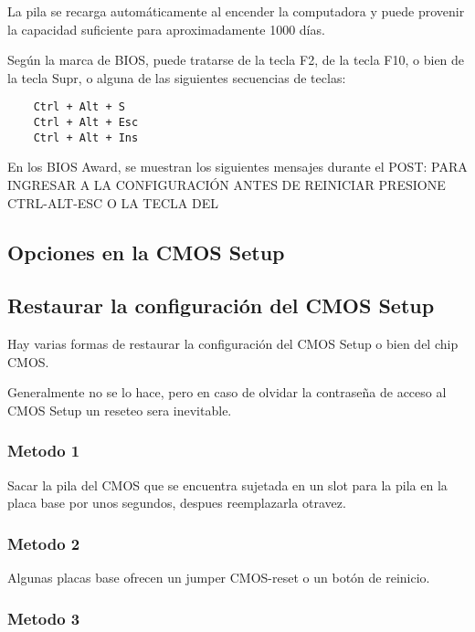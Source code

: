 \documentclass[12pt,oneside,a4paper]{article}
\begin{document}
	La pila se recarga automáticamente al encender la computadora y puede
	provenir la capacidad suficiente para aproximadamente 1000 días.

	Según la marca de BIOS, puede tratarse de la tecla F2, de la tecla F10, o
	bien de la tecla Supr, o alguna de las siguientes secuencias de teclas: 

	\begin{verbatim}
	Ctrl + Alt + S 
	Ctrl + Alt + Esc 
	Ctrl + Alt + Ins 
	\end{verbatim}

	En los BIOS Award, se muestran los siguientes mensajes durante el POST:
	PARA INGRESAR A LA CONFIGURACIÓN ANTES DE REINICIAR PRESIONE CTRL-ALT-ESC O LA TECLA DEL
	\subsection{Opciones en la CMOS Setup}

	\subsection{Restaurar la configuración del CMOS Setup}{\label{sec:cmossetup/resetear-el-cmos-setup}}

	Hay varias formas de restaurar la configuración del CMOS Setup o bien del chip CMOS.

	Generalmente no se lo hace, pero en caso de olvidar la contraseña de acceso al CMOS Setup un reseteo sera inevitable.

	\subsubsection{Metodo 1}{\label{sec:metodo 1}}

	Sacar la pila del CMOS que se encuentra sujetada en un slot para la pila en
	la placa base por unos segundos, despues reemplazarla otravez.

	\subsubsection{Metodo 2}{\label{sec:metodo 2}}

	Algunas placas base ofrecen un jumper CMOS-reset o un botón de reinicio.



	\subsubsection{Metodo 3}{\label{sec:metodo 3}}
\end{document}
